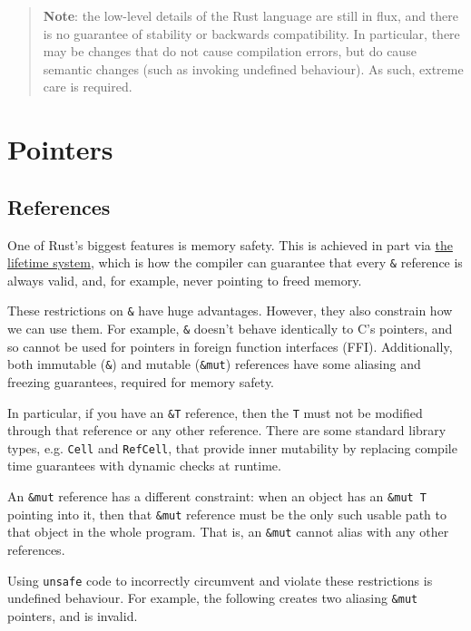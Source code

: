 \documentclass[]{article}
\begin{document}
\begin{quote}
\textbf{Note}: the low-level details of the Rust language are still in
flux, and there is no guarantee of stability or backwards compatibility.
In particular, there may be changes that do not cause compilation
errors, but do cause semantic changes (such as invoking undefined
behaviour). As such, extreme care is required.
\end{quote}

\section{Pointers}\label{pointers}

\subsection{References}\label{references}

One of Rust's biggest features is memory safety. This is achieved in
part via \href{guide-lifetimes.html}{the lifetime system}, which is how
the compiler can guarantee that every \texttt{\&} reference is always
valid, and, for example, never pointing to freed memory.

These restrictions on \texttt{\&} have huge advantages. However, they
also constrain how we can use them. For example, \texttt{\&} doesn't
behave identically to C's pointers, and so cannot be used for pointers
in foreign function interfaces (FFI). Additionally, both immutable
(\texttt{\&}) and mutable (\texttt{\&mut}) references have some aliasing
and freezing guarantees, required for memory safety.

In particular, if you have an \texttt{\&T} reference, then the
\texttt{T} must not be modified through that reference or any other
reference. There are some standard library types, e.g. \texttt{Cell} and
\texttt{RefCell}, that provide inner mutability by replacing compile
time guarantees with dynamic checks at runtime.

An \texttt{\&mut} reference has a different constraint: when an object
has an \texttt{\&mut T} pointing into it, then that \texttt{\&mut}
reference must be the only such usable path to that object in the whole
program. That is, an \texttt{\&mut} cannot alias with any other
references.

Using \texttt{unsafe} code to incorrectly circumvent and violate these
restrictions is undefined behaviour. For example, the following creates
two aliasing \texttt{\&mut} pointers, and is invalid.
\end{document}
